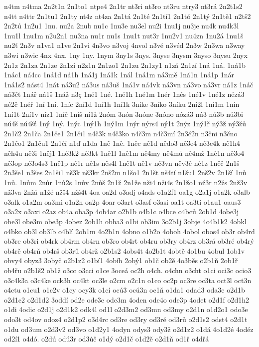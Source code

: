 n4tm
n4tma
2n2t1n
2n1to1
ntpe4
2n1tr
nt3ri
nt3ro
nt3ru
ntry3
nt3rá
2n2t1s2
n4tt
n4ttr
2n1tu1
2n1ty
nt4z
nt4za
2n1tá
2n1té
2n1tí1
2n1tó
2n1tý
2n1tě1
n2tš2
2n2tů
1n2u1
1nu.
nu2a
2nub
nu1c
1nu3e
nu3el
nu2i
1nu1j
nu3je
nu4k
nu4k3l
1nu1l
1nu1m
n2u2n1
nu3na
nu1r
nu1s
1nu1t
nut3r
1nu2v1
nu4zn
1nu2á
1nu1š
nu2ť
2n3v
n1va1
n1ve
2n1vi
4n3vo
n3voj
4nvol
n3vé
n3véd
2n3w
2n3wa
n3way
n3wi
n3wic
4nx
4nx.
1ny
1ny.
1nym
3ny1s
3nys.
3nyse
3nysm
3nyso
3nysu
2nyx
2n1z
2n1za
2n1ze
2n1zi
n2z1n
2n1zo1
2n1zu
2n1zy1
n1zá
2n1zí
1ná
1ná.
1ná1b
1nác1
ná4cc
1ná1d
ná1h
1ná1j
1ná1k
1nál
1ná1m
ná3mě
1ná1n
1ná1p
1nár
1ná1s2
nást4
1nát
ná3u2
ná3us
ná3uš
1ná1v
ná4vk
ná3vn
ná3vo
ná3vr
ná1z
1náč
ná3čt
1nář
ná1š
1náž
n3ç
1né1
1né.
1né1h
1né1m
1nér
1nés
1né1v
1né1z
nézá3
né2č
1néř
1ní
1ní.
1níc
2ní1d
1ní1h
1ní1k
3níke
3níko
3níku
2ní2l
1ní1m
1nín
1ní1t
2ní1v
níz1
1níč
1níš
ní1ž
2nóm
3nón
3nóne
3nóno
nózá3
nú3
nú3b
nú3bi
nú4š
nú4šť
1ný
1ný.
1nýc
1ný1h
1ný1m
1nýr
nýrs4
ný1t
2nýz
1ný1ř
ný3ž
ný3žů
2n1č2
2n1ča
2n1če1
2n1či1
n4č3k
n4č3ko
n4č3m
n4č3mí
2n3č2n
n3čni
n3čno
2n1čo1
2n1ču1
2n1čí
n1ď
n1ďa
1ně
1ně.
1něc
ně1d
nědo3
ně3e4
ně3e4k
ně1h4
něh4u
ně3i
1něj1
1ně3k2
ně3kt
1ně1l
1ně1m
ně4my
ně4mů
ně4mž
1ně1n
ně3o4
ně3op
ně3o4s3
1ně1p
ně1r
ně1s
něs4l
1ně1t
ně1v
ně3vn
něv3č
ně1z
1něč
2n1š
2n3še1
n3šes
2n1ši1
nš3k
nš3kr
2nš2m
n1šo1
2n1št
nš4tí
n1šu1
2nš2v
2n1ší
1nů
1nů.
1nům
2nůr
1nů2s
1nův
2nůš
2n1ž
2n1že
nži4
nži4s
2n1žo1
nž3r
n2žs
2nž3v
nž3va
2nžá
n1žé
nžš4
nžš4t
4oa
oa2d
o3adj
o4ads
o1a2f1
oa1g
o2a1j
o1a2k
o3alb
o3alk
o1a2m
oa3mi
o1a2n
oa2p
4oar
o3art
o3asf
o3asi
oa1t
oa3ti
o1au1
oaus3
o3a2x
o3axi
o2az
ob4a
oba3p
4ob4ar
o2b1b
o4b1c
o4bce
o4bců
2ob1d
4obe3j
obe3l
obe3m
obe3p
4obez
2ob1h
obha3
o1bi
ob3im
3o2b1j
3obje
4o4b1k2
4obkl
o4bko
ob3l
ob3lb
o4blí
2ob1m
4o2b1n
4obno
o1b2o
4oboh
4obol
obos4
ob3r
ob4rd
ob3re
ob3ri
ob4rk
ob4rm
ob4rn
ob3ro
ob4rt
ob4ru
ob3ry
ob4rz
ob3rá
ob3ré
ob4rý
ob4rč
ob4rň
ob4rš
ob3rů
ob4rž
o2b1s2
4obs4t
4o2b1t
4obtě
4o1bu
4obul
1ob1v
obvy4
obyz3
3obyč
o2b1z2
o1bí1
4obíh
2obý1
ob1č
ob2ě
4o3běs
o2b1ň
2ob1ř
ob4řu
o2b1š2
ob1ž
o3cc
o3cci
o1ce
3oceá
oc2h
o4ch.
o4chn
o3cht
o1ci
oci3c
ocio3
o3c4k3a
o3c4ke
ock3h
oc4kt
oc3le
o2cm
o2c1n
o1co
oc2p
oc3re
oc3ta
oct3l
oct3n
o4ctu
o1cu1
o1c2v
o1cy
ocy3k
o1cí
ocú3
ocú3n
oc1ň
o1da1
odad3
oda3e
o2d1b
o2d1c2
o2d1d2
3oddí
od2e
ode3e
ode3m
4oden
ode4o
ode3p
4odet
o2d1f
o2d1h2
o1di
4odic
o2d1j
o2d1k2
odk4l
od1l
o2d3m2
od3mn
od3my
o2d1n
o1d2o1
odo3e
odo3t
od4ov
odoz4
o2d1p2
o3d4rc
od3re
od3ry
od3ré
od3rů
o2d1s2
odst4
o2d1t
o1du
od3um
o2d3v2
od3vo
o1d2y1
4odyn
odys3
ody3ž
o2d1z2
o1dá
4o1d2é
4odéz
od2í1
o4dó.
o2dú
odú3r
od3úč
o1dý
o2d1č
o1d2ě
o2d1ň
od1ř
o4dřá
